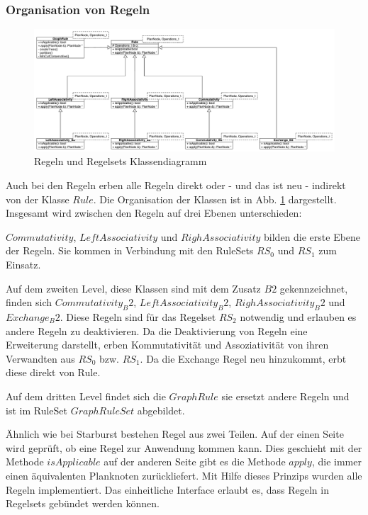 \subsubsection{Organisation von Regeln}


\begin{figure}[h]
  \centering
  \includegraphics[width=\textwidth]{04_Implementierung/Rules.pdf}
  \caption{Regeln und Regelsets Klassendiagramm}
  \label{RuleClassDiagram}
\end{figure}


Auch bei den Regeln erben alle Regeln direkt oder - und das ist neu - indirekt von der Klasse $Rule$. Die Organisation der Klassen ist in Abb. \ref{RuleClassDiagram} dargestellt. Insgesamt wird zwischen den Regeln auf drei Ebenen unterschieden: 

$Commutativity$, $LeftAssociativity$ und $RighAssociativity$ bilden die erste Ebene der Regeln. Sie kommen in Verbindung mit den RuleSets $RS_0$ und $RS_1$ zum Einsatz.

Auf dem zweiten Level, diese Klassen sind mit dem Zusatz $B2$ gekennzeichnet, finden sich $Commutativity_B2$, $LeftAssociativity_B2$, $RighAssociativity_B2$ und $Exchange_B2$. Diese Regeln sind für das Regelset $RS_2$ notwendig und erlauben es andere Regeln zu deaktivieren. Da die Deaktivierung von Regeln eine Erweiterung darstellt, erben Kommutativität und Assoziativität von ihren Verwandten aus $RS_0$ bzw. $RS_1$. Da die Exchange Regel neu hinzukommt, erbt diese direkt von Rule.

Auf dem dritten Level findet sich die $GraphRule$ sie ersetzt andere Regeln und ist im RuleSet $GraphRuleSet$ abgebildet.


Ähnlich wie bei Starburst bestehen Regel aus zwei Teilen. Auf der einen Seite wird geprüft, ob eine Regel zur Anwendung kommen kann. Dies geschieht mit der Methode $isApplicable$ auf der anderen Seite gibt es die Methode $apply$, die immer einen äquivalenten Planknoten zurückliefert. Mit Hilfe dieses Prinzips wurden alle Regeln implementiert. Das einheitliche Interface erlaubt es, dass Regeln in Regelsets gebündet werden können.


